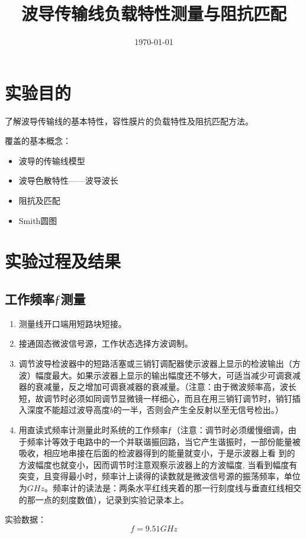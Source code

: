 \documentclass{../source/Experiment}
\title{波导传输线负载特性测量与阻抗匹配}
\date{\today}
\begin{document}
    \makecover
    \makeheader

    \section{实验目的}
    了解波导传输线的基本特性，容性膜片的负载特性及阻抗匹配方法。
    
    覆盖的基本概念：
    \begin{itemize}
        \item 波导的传输线模型
        \item 波导色散特性——波导波长
        \item 阻抗及匹配
        \item Smith圆图
    \end{itemize}

    \section{实验过程及结果}

        \subsection{工作频率$ƒ$测量}
            \begin{enumerate}
                \item 测量线开口端用短路块短接。
                \item 接通固态微波信号源，工作状态选择方波调制。
                \item 调节波导检波器中的短路活塞或三销钉调配器使示波器上显示的检波输出（方波）幅度最大。如果示波器上显示的输出幅度还不够大，可适当减少可调衰减器的衰减量，反之增加可调衰减器的衰减量。（注意：由于微波频率高，波长短，故调节时必须如同调节显微镜一样细心，而且在用三销钉调节时，销钉插入深度不能超过波导高度$b $的一半，否则会产生全反射以至无信号检出。）
                \item 用直读式频率计测量此时系统的工作频率$ƒ$（注意：调节时必须缓慢细调，由于频率计等效于电路中的一个并联谐振回路，当它产生谐振时，一部份能量被吸收，相应地串接在后面的检波器得到的能量就变小，于是示波器上看 到的方波幅度也就变小，因而调节时注意观察示波器上的方波幅度, 当看到幅度有突变，且变得最小时，频率计上读得的读数就是微波信号源的振荡频率，单位为$GHz$。频率计的读法是：两条水平红线夹着的那一行刻度线与垂直红线相交的那一点的刻度数值），记录到实验记录本上。
            \end{enumerate}

            实验数据：$$f = 9.51GHz$$
\end{document}

